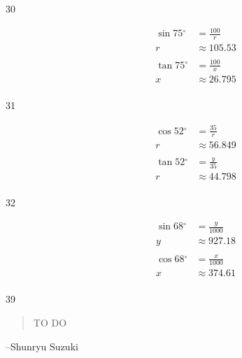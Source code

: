 \documentclass{exam}
\newcommand{\dg}{\ensuremath{^\circ}}
\begin{document}
\begin{description}
      \item[30]
        \begin{align*}
          \sin 75 \dg & = \frac{100}{r} \\
          r           & \approx \boxed{ 105.53 } \\
          \\
          \tan 75 \dg & = \frac{100}{x} \\
          x           & \approx \boxed{ 26.795 } \\
        \end{align*}

      \item[31]
        \begin{align*}
          \cos 52 \dg & = \frac{35}{r} \\
          r           & \approx \boxed{ 56.849 } \\
          \\
          \tan 52 \dg & = \frac{y}{35} \\
          r           & \approx \boxed{ 44.798 } \\
        \end{align*}

      \item[32]
        \begin{align*}
          \sin 68 \dg & = \frac{y}{1000} \\
          y           & \approx \boxed{ 927.18 } \\
          \\
          \cos 68 \dg & = \frac{x}{1000} \\
          x           & \approx \boxed{ 374.61 } \\
        \end{align*}

      \item[39]

    \end{description}

  \else
    \vspace{1 cm}
    \begin{quote}
      \begin{em}
        TO DO
      \end{em}
    \end{quote}
    \hspace{1 cm} --Shunryu Suzuki
  \fi
\end{document}
